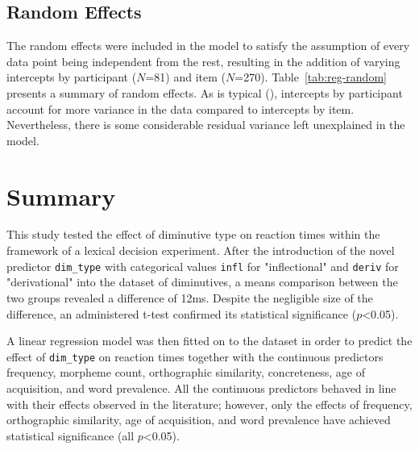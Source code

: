\subsection{Random Effects}
The random effects were included in the model to satisfy the assumption of every data point being independent from the rest, resulting in the addition of varying intercepts by participant ($N$=81) and item ($N$=270). Table~\ref{tab:reg-random} presents a summary of random effects. As is typical (\cite{Winter+2019}), intercepts by participant account for more variance in the data compared to intercepts by item. Nevertheless, there is some considerable residual variance left unexplained in the model.

\begin{table}[ht]
\centering
{}
\caption[Summary of random effects from the experimental model]{Summary of random effects from the experimental model.}
\label{tab:reg-random}
\end{table}

\section{Summary} \label{sec:5-stats_summary}
This study tested the effect of diminutive type on reaction times within the framework of a lexical decision experiment. After the introduction of the novel predictor \texttt{dim\_type} with categorical values \texttt{infl} for "inflectional" and \texttt{deriv} for "derivational" into the dataset of diminutives, a means comparison between the two groups revealed a difference of 12ms. Despite the negligible size of the difference, an administered t-test confirmed its statistical significance ($p$<0.05). 

A linear regression model was then fitted on to the dataset in order to predict the effect of \texttt{dim\_type} on reaction times together with the continuous predictors frequency, morpheme count, orthographic similarity, concreteness, age of acquisition, and word prevalence. All the continuous predictors behaved in line with their effects observed in the literature; however, only the effects of frequency, orthographic similarity, age of acquisition, and word prevalence have achieved statistical significance (all $p$<0.05). 

